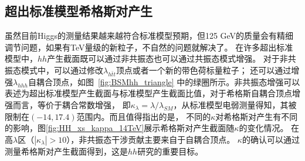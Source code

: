 \subsection{超出标准模型希格斯对产生}
虽然目前Higgs的测量结果越来越符合标准模型预期，但125 GeV的质量会有精细调节问题，如果有TeV量级的新粒子，不自然的问题就解决了。
在许多超出标准模型中，$hh$产生截面既可以通过非共振态也可以通过共振态模式增强。
对于非共振态模式中，可以通过修改$\lambda_{h\bar{t}t}$顶点\cite{Grober:2010yv,Contino:2012xk}或者一个新的带色荷标量粒子\cite{Kribs:2012kz}；
还可以通过增强$\lambda_{hhh}$自耦合顶点，如图~\ref{fig:BSMhh_triangle}
中的绿圈所示。非共振态增强可以表述为超出标准模型产生截面与标准模型产生截面比值，对于希格斯自耦合顶点增强而言，等价于耦合常数增强，
即$\kappa_{\lambda}=\lambda/\lambda_{SM}$，从标准模型电弱测量得知，其被限制在$(-14, 17.4)$\cite{Kribs:2017znd}范围内。而且值得指出的是，
不同的$\kappa$对希格斯对产生有不同的影响\cite{Frederix:2014hta}，图\ref{fig:HH_xs_kappa_14TeV}展示希格斯对产生截面随$\kappa$的变化情况。
在高$\lambda$区（$|\kappa_{\lambda}|>10$），非共振态干涉贡献主要来自于自耦合顶点。
$\kappa$的确认可以通过测量希格斯对产生截面得到，这是$hh$研究的重要目标。
